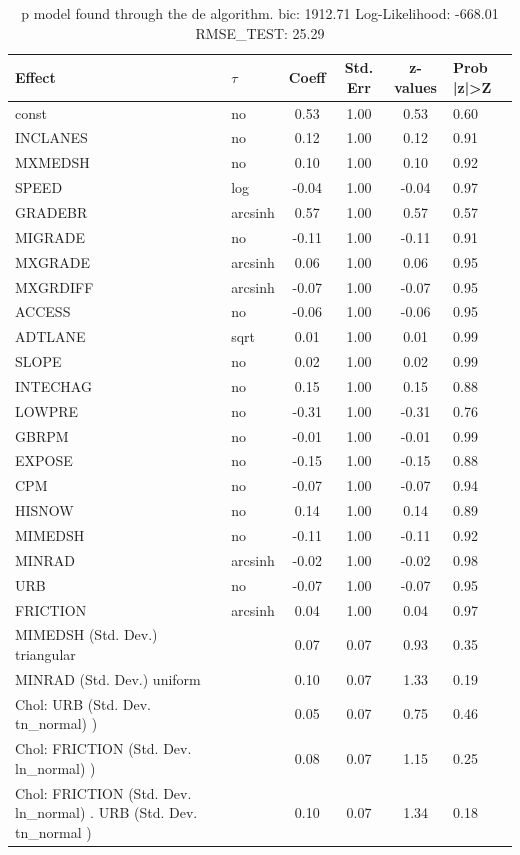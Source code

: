 \begin{table}
	\caption{p model found through the de algorithm. bic: 1912.71 Log-Likelihood: -668.01 RMSE_TEST: 25.29}
	\begin{center}
		\begin{tabular}{|l|l|c|c|c|l|}
			\hline
			Effect & $\tau$ & Coeff & Std. Err & z-values & Prob |z|>Z \\
			\hline
			const & no & 0.53 & 1.00 & 0.53 & 0.60 \\
			\hline
			INCLANES & no & 0.12 & 1.00 & 0.12 & 0.91 \\
			\hline
			MXMEDSH & no & 0.10 & 1.00 & 0.10 & 0.92 \\
			\hline
			SPEED & log & -0.04 & 1.00 & -0.04 & 0.97 \\
			\hline
			GRADEBR & arcsinh & 0.57 & 1.00 & 0.57 & 0.57 \\
			\hline
			MIGRADE & no & -0.11 & 1.00 & -0.11 & 0.91 \\
			\hline
			MXGRADE & arcsinh & 0.06 & 1.00 & 0.06 & 0.95 \\
			\hline
			MXGRDIFF & arcsinh & -0.07 & 1.00 & -0.07 & 0.95 \\
			\hline
			ACCESS & no & -0.06 & 1.00 & -0.06 & 0.95 \\
			\hline
			ADTLANE & sqrt & 0.01 & 1.00 & 0.01 & 0.99 \\
			\hline
			SLOPE & no & 0.02 & 1.00 & 0.02 & 0.99 \\
			\hline
			INTECHAG & no & 0.15 & 1.00 & 0.15 & 0.88 \\
			\hline
			LOWPRE & no & -0.31 & 1.00 & -0.31 & 0.76 \\
			\hline
			GBRPM & no & -0.01 & 1.00 & -0.01 & 0.99 \\
			\hline
			EXPOSE & no & -0.15 & 1.00 & -0.15 & 0.88 \\
			\hline
			CPM & no & -0.07 & 1.00 & -0.07 & 0.94 \\
			\hline
			HISNOW & no & 0.14 & 1.00 & 0.14 & 0.89 \\
			\hline
			MIMEDSH & no & -0.11 & 1.00 & -0.11 & 0.92 \\
			\hline
			MINRAD & arcsinh & -0.02 & 1.00 & -0.02 & 0.98 \\
			\hline
			URB & no & -0.07 & 1.00 & -0.07 & 0.95 \\
			\hline
			FRICTION & arcsinh & 0.04 & 1.00 & 0.04 & 0.97 \\
			\hline
			MIMEDSH (Std. Dev.) triangular &  & 0.07 & 0.07 & 0.93 & 0.35 \\
			\hline
			MINRAD (Std. Dev.) uniform &  & 0.10 & 0.07 & 1.33 & 0.19 \\
			\hline
			 Chol: URB (Std. Dev. tn_normal) ) &  & 0.05 & 0.07 & 0.75 & 0.46 \\
			\hline
			 Chol: FRICTION (Std. Dev. ln_normal) ) &  & 0.08 & 0.07 & 1.15 & 0.25 \\
			\hline
			 Chol: FRICTION (Std. Dev. ln_normal) . URB (Std. Dev.   tn_normal ) &  & 0.10 & 0.07 & 1.34 & 0.18 \\
			\hline
		\end{tabular}
	\end{center}
\end{table}